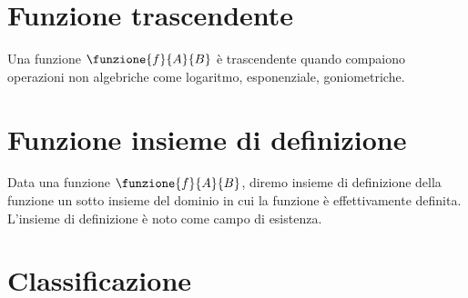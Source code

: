 \section{Funzione trascendente}
	Una funzione $\funzione{f}{A}{B}$  è trascendente quando compaiono operazioni non algebriche come logaritmo, esponenziale, goniometriche.
\section{Funzione insieme di definizione}
Data una funzione $\funzione{f}{A}{B}$, diremo insieme di definizione della funzione un sotto insieme del dominio in cui la funzione è effettivamente definita. L'insieme di definizione è noto come campo di esistenza.

{\centering
	
	\par}
\section{Classificazione}
{\centering
	
	\par}
